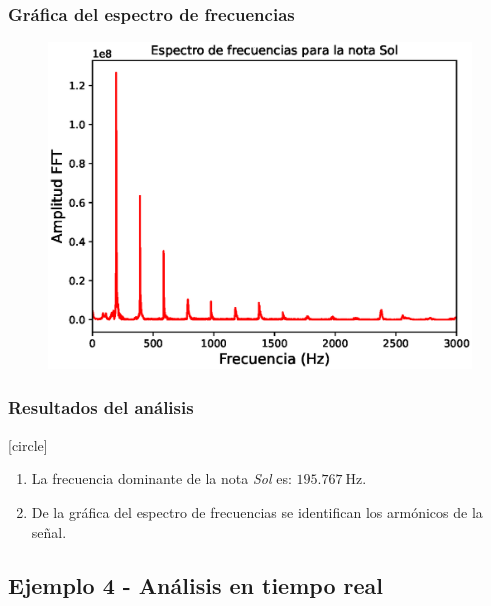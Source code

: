 \documentclass[12pt]{beamer}
\begin{document}
\begin{frame}
\frametitle{Gráfica del espectro de frecuencias}
\begin{figure}
    \centering
    \includegraphics[scale=0.6]{Imagenes/DFT_Analisis_Senal_Audio_02.eps}
\end{figure}
\end{frame}
\begin{frame}
\frametitle{Resultados del análisis}
[circle]
\begin{enumerate}[<+->]
\item La frecuencia dominante de la nota \emph{Sol} es: $\SI{195.767}{\hertz}$.
\item De la gráfica del espectro de frecuencias se identifican los armónicos de la señal.
\end{enumerate}
\end{frame}

\subsection{Ejemplo 4 - Análisis en tiempo real}
\end{document}
